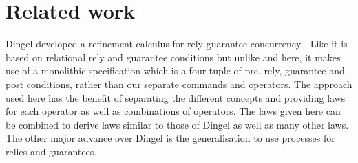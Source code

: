 \documentclass[fleqn]{fac}
\begin{document}
\section{Related work}

Dingel developed a refinement calculus for rely-guarantee concurrency \cite{DingelPhD,Dingel02}.
Like \cite{HayesJonesColvin14TR} it is based on relational rely and guarantee conditions
but unlike \cite{HayesJonesColvin14TR} and here, 
it makes use of a monolithic specification which is a four-tuple of pre, rely, guarantee and post conditions,
rather than our separate commands and operators.
The approach used here has the benefit of separating the different concepts 
and providing laws for each operator as well as combinations of operators.
The laws given here can be combined to derive laws similar to those of Dingel as well as many other laws.
The other major advance over Dingel is the generalisation to use processes 
for relies and guarantees.
\end{document}
